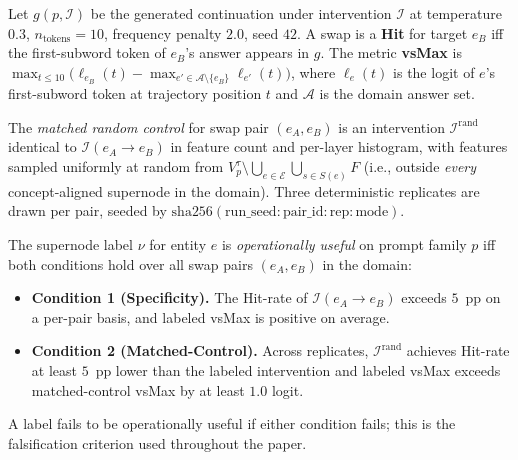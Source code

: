 \begin{definition}
\label{def:hit}
Let $g(p, \mathcal{I})$ be the generated continuation under intervention $\mathcal{I}$ at temperature $0.3$, $n_{\mathrm{tokens}}{=}10$, frequency penalty $2.0$, seed $42$. A swap is a \textbf{Hit} for target $e_B$ iff the first-subword token of $e_B$'s answer appears in $g$. The metric \textbf{vsMax} is $\max_{t \leq 10}\big(\ell_{e_B}(t) - \max_{e' \in \mathcal{A}\setminus\{e_B\}} \ell_{e'}(t)\big)$, where $\ell_e(t)$ is the logit of $e$'s first-subword token at trajectory position $t$ and $\mathcal{A}$ is the domain answer set.
\end{definition}

\begin{definition}
\label{def:matched}
The \emph{matched random control} for swap pair $(e_A, e_B)$ is an intervention $\mathcal{I}^{\mathrm{rand}}$ identical to $\mathcal{I}(e_A \to e_B)$ in feature count and per-layer histogram, with features sampled uniformly at random from $V_p^{\tau} \setminus \bigcup_{e \in \mathcal{E}} \bigcup_{s \in S(e)} F$ (i.e., outside \emph{every} concept-aligned supernode in the domain). Three deterministic replicates are drawn per pair, seeded by $\mathrm{sha256}(\mathrm{run\_seed} : \mathrm{pair\_id} : \mathrm{rep} : \mathrm{mode})$.
\end{definition}

\begin{definition}
\label{def:opuseful}
The supernode label $\nu$ for entity $e$ is \emph{operationally useful} on prompt family $p$ iff both conditions hold over all swap pairs $(e_A, e_B)$ in the domain:
\begin{itemize}\itemsep0pt
\item \textbf{Condition 1 (Specificity).} The Hit-rate of $\mathcal{I}(e_A \to e_B)$ exceeds $5$~pp on a per-pair basis, and labeled vsMax is positive on average.
\item \textbf{Condition 2 (Matched-Control).} Across replicates, $\mathcal{I}^{\mathrm{rand}}$ achieves Hit-rate at least $5$~pp lower than the labeled intervention and labeled vsMax exceeds matched-control vsMax by at least $1.0$ logit.
\end{itemize}
A label fails to be operationally useful if either condition fails; this is the falsification criterion used throughout the paper.
\end{definition}
